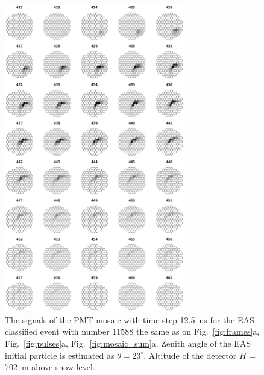 \documentclass[final,5p,times,twocolumn]{elsarticle}
\begin{document}
\begin{figure}[pt]
    \centering
    \includegraphics[width=0.7\textwidth]{figs/mosaic_11588_lin.eps}%
    \caption{The signals of the PMT mosaic with time step 12.5~ns for the EAS classified event with number 11588 the same as on Fig.~\ref{fig:frames}a, Fig.~\ref{fig:pulses}a, Fig.~\ref{fig:mosaic_sum}a. Zenith angle of the EAS initial particle is estimated as $\theta = 23^{\circ}$. Altitude of the detector $H$ = 702~m above snow level.
    }
    \label{fig:mosaic_eas}
\end{figure}
\end{document}
